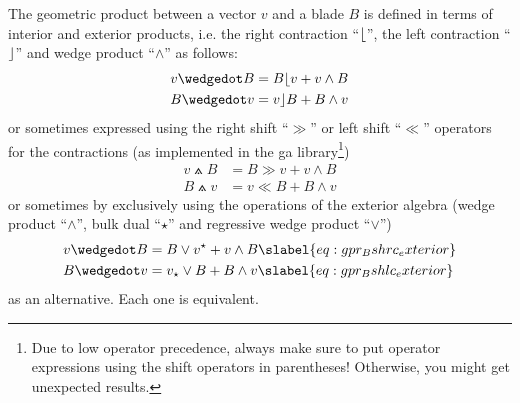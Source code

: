 The geometric product between a vector $v$ and a blade $B$ is defined in terms of interior
and exterior products, i.e. the right contraction ``$\lfloor$'', the left contraction
``$\rfloor$'' and wedge product ``$\wedge$'' as follows:
\begin{subequations}
    \begin{align}
    v \wedgedot B & =  B \rcontr v + v \wedge B
    \label{eq:gpr_Brc} \\
    B \wedgedot v & =  v \lcontr B + B \wedge v
    \label{eq:gpr_Blc}
    \end{align}
\end{subequations}
or sometimes expressed using the right shift ``$\gg$'' or left shift ``$\ll$'' operators
for the contractions (as implemented in the ga library\footnote{Due to low \Cpp operator
precedence, always make sure to put operator expressions using the shift operators in
parentheses! Otherwise, you might get unexpected results.})
\begin{subequations}
    \begin{align}
    v \wedgedot B & = B \gg v + v \wedge B
    \label{eq:gpr_Bshrc} \\
    B \wedgedot v & =  v \ll B + B \wedge v
    \label{eq:gpr_Bshlc}
    \end{align}
\end{subequations}
or sometimes by exclusively using the operations of the exterior algebra (wedge product
``$\wedge$'', bulk dual ``$\star$'' and regressive wedge product ``$\vee$'')
\begin{subequations}
    \label{eq:gpr_Bsh_exterior}
    \begin{align}
    v \wedgedot B & = B \vee \rightbulkdual{v} + v \wedge B
    \slabel{eq:gpr_Bshrc_exterior} \\
    B \wedgedot v & = \leftbulkdual{v} \vee B + B \wedge v
    \slabel{eq:gpr_Bshlc_exterior}
    \end{align}
\end{subequations}
as an alternative. Each one is equivalent. \\

